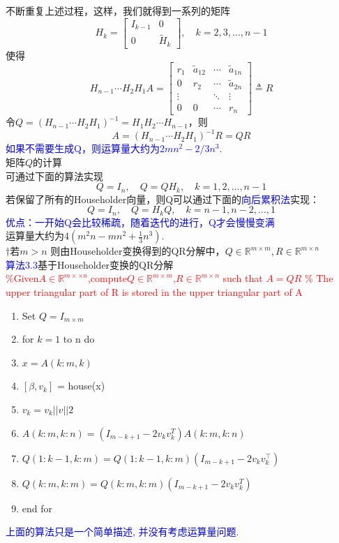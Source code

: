\documentclass[12pt,a4paper]{article}
\begin{document}
不断重复上述过程，这样，我们就得到一系列的矩阵
$$
H_{k}=\left[\begin{array}{cc}{I_{k-1}} & {0} \\ {0} & {\tilde{H}_{k}}\end{array}\right], \quad k=2,3, \ldots, n-1
$$
使得
$$
H_{n-1} \cdots H_{2} H_{1} A=\left[\begin{array}{cccc}{r_{1}} & {\tilde{a}_{12}} & {\cdots} & {\tilde{a}_{1 n}} \\ {0} & {r_{2}} & {\cdots} & {\tilde{a}_{2 n}} \\ {\vdots} & {} & {\ddots} & {\vdots} \\ {0} & {0} & {\cdots} & {r_{n}}\end{array}\right] \triangleq R
$$
令$Q=\left(H_{n-1} \cdots H_{2} H_{1}\right)^{-1}=H_{1} H_{2} \cdots H_{n-1}$，则
$$
A=\left(H_{n-1} \cdots H_{2} H_{1}\right)^{-1} R=Q R
$$
\textcolor{blue}{如果不需要生成Q，则运算量大约为$2mn^{2}-2/3n^{3}$}.\\

\noindent 矩阵$Q$的计算\\
可通过下面的算法实现
$$
Q=I_{n}, \quad Q=Q H_{k}, \quad k=1,2, \ldots, n-1
$$
若保留了所有的Householder向量，则Q可以通过下面的\textcolor{blue}{向后累积法}实现：
$$
Q=I_{n}, \quad Q=H_{k} Q, \quad k=n-1, n-2, \ldots, 1
$$
\textcolor{blue}{优点：一开始Q会比较稀疏，随着迭代的进行，Q才会慢慢变满}\\
运算量大约为$4(m^{2}n-mn^{2}+\frac{1}{3}n^{3})$.\\
$\dagger$若$m>n$ 则由Householder变换得到的QR分解中，$Q\in\mathbb{R}^{m\times m},R\in\mathbb{R}^{m\times n}$
\textcolor{blue}\\

\noindent \textcolor{blue}{算法3.3}基于Householder变换的QR分解\\
\textcolor{red}{\%Given$A \in \mathbb{R}^{m×\times n}$,compute$Q \in \mathbb{R}^{m\times m}$,$R\in \mathbb{R}^{m\times n}$ such that $A = QR$ \% The upper triangular part of R is stored in the upper triangular part of A}
\begin{enumerate}[1:]
	\item Set $Q=I_{m\times m}$
	\item for $k=1$ to n do
	\item \qquad $x=A(k:m,k)$
	\item \qquad$[\beta, v_{k}]$ = house(x)
	\item \qquad$v_{k} = v_{k}||v||2$
	\item \qquad$A(k:m,k:n)=(I_{m-k+1} −2v_{k}v_{k}^{T})A(k:m,k:n)$
	\item \qquad$Q(1:k−1,k:m)=Q(1:k−1,k:m)(I_{m−k+1} -2v_{k}v_{k}^{⊺})$
	\item \qquad$Q(k:m,k:m)=Q(k:m,k:m)(I_{m−k+1} -2v_{k}v_{k}^{T})$
	\item end for
\end{enumerate}
\textcolor{blue}{上面的算法只是一个简单描述, 并没有考虑运算量问题}.\\
\end{document}

